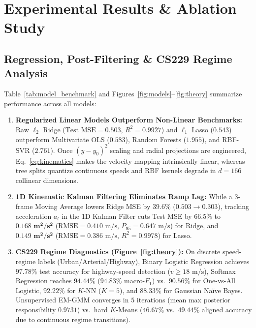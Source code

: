 \documentclass[10pt,twocolumn]{article}
\begin{document}
\section{Experimental Results \& Ablation Study}
\subsection{Regression, Post-Filtering \& CS229 Regime Analysis}
Table~\ref{tab:model_benchmark} and Figures~\ref{fig:models}--\ref{fig:theory} summarize performance across all models:
\begin{enumerate}
  \item \textbf{Regularized Linear Models Outperform Non-Linear Benchmarks:} Raw $\ell_2$ Ridge ($\text{Test MSE} = 0.503$, $R^2 = 0.9927$) and $\ell_1$ Lasso ($0.543$) outperform Multivariate OLS ($0.583$), Random Forests ($1.955$), and RBF-SVR ($2.761$). Once $(y-y_0)^2$ scaling and radial projections are engineered, Eq.~\eqref{eq:kinematics} makes the velocity mapping intrinsically linear, whereas tree splits quantize continuous speeds and RBF kernels degrade in $d=166$ collinear dimensions.
  \item \textbf{1D Kinematic Kalman Filtering Eliminates Ramp Lag:} While a 3-frame Moving Average lowers Ridge MSE by $39.6\%$ ($0.503 \to 0.303$), tracking acceleration $a_t$ in the 1D Kalman Filter cuts Test MSE by $66.5\%$ to $\mathbf{0.168\text{ m}^2/\text{s}^2}$ ($\text{RMSE} = 0.410\text{ m/s}$, $P_{95} = 0.647\text{ m/s}$) for Ridge, and $\mathbf{0.149\text{ m}^2/\text{s}^2}$ ($\text{RMSE} = 0.386\text{ m/s}$, $R^2 = 0.9978$) for Lasso.
  \item \textbf{CS229 Regime Diagnostics (Figure~\ref{fig:theory}):} On discrete speed-regime labels (Urban/Arterial/Highway), Binary Logistic Regression achieves $97.78\%$ test accuracy for highway-speed detection ($v \ge 18\text{ m/s}$), Softmax Regression reaches $94.44\%$ ($94.83\%$ macro-$F_1$) vs.\ $90.56\%$ for One-vs-All Logistic, $92.22\%$ for $K$-NN ($K=5$), and $88.33\%$ for Gaussian Na\"{i}ve Bayes. Unsupervised EM-GMM converges in $5$ iterations (mean max posterior responsibility $0.9731$) vs.\ hard $K$-Means ($46.67\%$ vs.\ $49.44\%$ aligned accuracy due to continuous regime transitions).
\end{enumerate}
\end{document}

